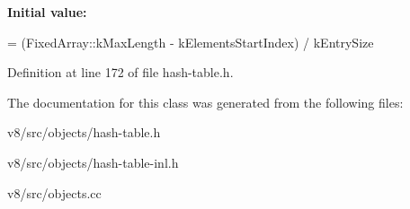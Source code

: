{\bfseries Initial value\+:}
\begin{DoxyCode}
=
      (FixedArray::kMaxLength - kElementsStartIndex) / kEntrySize
\end{DoxyCode}


Definition at line 172 of file hash-\/table.\+h.



The documentation for this class was generated from the following files\+:\begin{DoxyCompactItemize}
\item 
v8/src/objects/hash-\/table.\+h\item 
v8/src/objects/hash-\/table-\/inl.\+h\item 
v8/src/objects.\+cc\end{DoxyCompactItemize}
